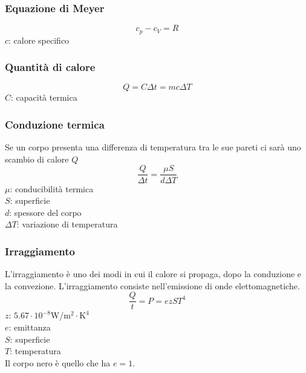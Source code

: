 \subsubsection{Equazione di Meyer}
\begin{equation*}
  c_p - c_V = R
\end{equation*}
$c$: calore specifico

\subsubsection{Quantità di calore}
\begin{equation*}
  Q = C\Delta t = mc\Delta T
\end{equation*}
$C$: capacità termica

\subsubsection{Conduzione termica}
\begin{center}
\end{center}
Se un corpo presenta una differenza di temperatura tra le sue pareti ci sarà uno scambio di calore
$Q$
\begin{equation*}
  \frac{Q}{\Delta t} = \frac{\mu S}{d\Delta T}
\end{equation*}
$\mu$: conducibilità termica\\
$S$: superficie\\
$d$: spessore del corpo\\
$\Delta T$: variazione di temperatura

\subsubsection{Irraggiamento}
L'irraggiamento è uno dei modi in cui il calore si propaga, dopo la conduzione e la convezione.
L'irraggiamento consiste nell'emissione di onde elettomagnetiche.
\begin{equation*}
  \frac{Q}{t} = P = ezST^4
\end{equation*}
\hyperref[tab:z]{$z$}: $5.67\cdot10^{-8}$W/$\text{m}^2\cdot\text{K}^4$\\
$e$: emittanza\\
$S$: superficie\\
$T$: temperatura\\ [\baselineskip]
Il corpo nero è quello che ha $e=1$.

